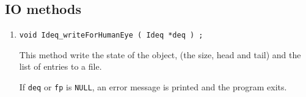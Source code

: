 \subsection{IO methods}
\label{subsection:Ideq:proto:IO}
\par
\begin{enumerate}
\item
\begin{verbatim}
void Ideq_writeForHumanEye ( Ideq *deq ) ;
\end{verbatim}
This method write the state of the object, (the size, head and
tail) and the list of entries to a file.
\par {}
If {\tt deq} or {\tt fp} is {\tt NULL},
an error message is printed and the program exits.
\end{enumerate}
